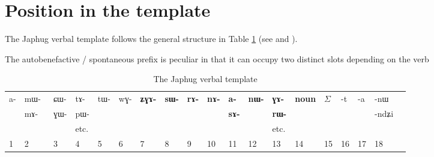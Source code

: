 \documentclass[oldfontcommands,oneside,a4paper,11pt]{article}
\newcommand{\ipab}[1]{{\phon \mbox{#1}}} %
\newcommand{\grise}[1]{\cellcolor{lightgray}\textbf{#1}}
\begin{document}

\section{Position in the template}
The Japhug verbal template follows the general structure in Table \ref{tab:template:derivational} (see \citealt{jacques12incorp} and \citealt{jacques13harmonization}). 

The autobenefactive / spontaneous prefix is peculiar in that it can occupy two distinct slots depending on the verb 
  \begin{landscape}
\begin{table}[H]
\caption{The Japhug verbal template }\label{tab:template:derivational}
\begin{tabular}{llllll|llllllll|lllll} \toprule
 
\ipab{a-}  &  	\ipab{mɯ- }   &  	\ipab{ɕɯ-}   &\ipab{tɤ-} &  	\ipab{tɯ-}  &  	\ipab{wɣ-}   &

  	 \grise{\ipab{ʑɣɤ-}}  &  	\grise{\ipab{sɯ-}}  & \grise{\ipab{rɤ-}}& \grise{\ipab{nɤ-}} &   	 \grise{\ipab{a-}}   &  	\grise{\ipab{nɯ-}}  &  	\grise{\ipab{ɣɤ-}}  &  	\grise{\ipab{noun}}    &  	 \begin{math}\Sigma\end{math}    &  	\ipab{-t}  &  	\ipab{-a}  &  	\ipab{-nɯ}   &  \\
   &  	\ipab{mɤ-}   &  	\ipab{ɣɯ-}   &\ipab{pɯ-}&  	  &  	 
    & \grise{ }	  &  	 \grise{ }	  &  	  \grise{ }	  &  	   \grise{ }	&  	\grise{\ipab{sɤ-}}&  \grise{ }	 &  	\grise{\ipab{rɯ-}}  &  	 \grise{ }	  &  	  &  	  &  	  &  	\ipab{-ndʑi} &  \\
  &  	   &     &  etc.	  & & 	  &  	  &  	 & &  	  &  	 & &  etc.	  &  	  &  	  &  	  &  	  &  	  &  \\
1  &  	2  &  	3  &  	4  &  	5  &  	6  &  	7  &  	8  &  	9  &  	10  &  	11  &  	12  &  	13  &  	14  &  	15  & 16 &17&18\\
\bottomrule
\end{tabular}
\end{table}
\begin{multicols}{2}
\begin{enumerate}



\end{enumerate}
\end{multicols}
\end{landscape}
\end{document}
